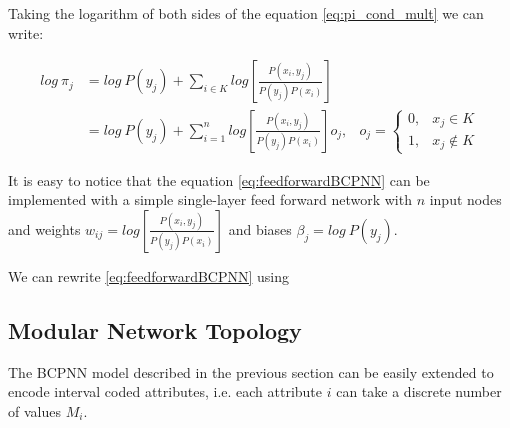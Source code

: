 Taking the logarithm of both sides of the equation \eqref{eq:pi_cond_mult} we can write:

\begin{equation}
\begin{aligned}
    log\ \pi_{j} & = log\ P(y_j) + \sum\limits_{i \in K}log\left[\frac{P(x_i,y_j)}{P(y_j)P(x_i)}\right] \\
    & = log\ P(y_j) + \sum\limits_{i=1}^n log\left[\frac{P(x_i,y_j)}{P(y_j)P(x_i)}\right]o_ {j},
    & o_j = \begin{cases}
    0, &  x_j \in K\\
    1, &  x_j \notin K
    \end{cases}
\end{aligned}
    \label{eq:feedforwardBCPNN}
\end{equation}

It is easy to notice that the equation \eqref{eq:feedforwardBCPNN} can be implemented with a simple single-layer feed forward network with $n$ input nodes and weights 
$w_{ij} = log\left[\frac{P(x_i,y_j)}{P(y_j)P(x_i)}\right]$ and biases $\beta_j = log\ P(y_j)$. 

We can rewrite \eqref{eq:feedforwardBCPNN} using 
\subsection{Modular Network Topology}
  The BCPNN model described in the previous section can be easily extended to  encode interval coded attributes, i.e. each attribute $i$ can take a discrete number of values $M_i$. 
